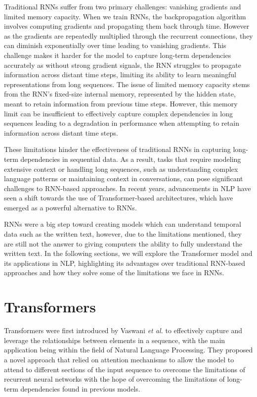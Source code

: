 Traditional RNNs suffer from two primary challenges: vanishing gradients and limited memory capacity. When we train RNNs, the backpropagation algorithm involves computing gradients and propagating them back through time. However as the gradients are repeatedly multiplied through the recurrent connections, they can diminish exponentially over time leading to vanishing gradients. This challenge makes it harder for the model to capture long-term dependencies accurately as without strong gradient signals, the RNN struggles to propagate information across distant time steps, limiting its ability to learn meaningful representations from long sequences. The issue of limited memory capacity stems from the RNN's fixed-size internal memory, represented by the hidden state, meant to retain information from previous time steps. However, this memory limit can be insufficient to effectively capture complex dependencies in long sequences leading to a degradation in performance when attempting to retain information across distant time steps.

These limitations hinder the effectiveness of traditional RNNs in capturing long-term dependencies in sequential data. As a result, tasks that require modeling extensive context or handling long sequences, such as understanding complex language patterns or maintaining context in conversations, can pose significant challenges to RNN-based approaches. In recent years, advancements in NLP have seen a shift towards the use of Transformer-based architectures, which have emerged as a powerful alternative to RNNs. 

RNNs were a big step toward creating models which can understand temporal data such as the written text, however, due to the limitations mentioned, they are still not the answer to giving computers the ability to fully understand the written text. In the following sections, we will explore the Transformer model and its applications in NLP, highlighting its advantages over traditional RNN-based approaches and how they solve some of the limitations we face in RNNs.

\section{Transformers}

Transformers were first introduced by Vaswani \textit{et al.} \cite{transformer_paper} to effectively capture and leverage the relationships between elements in a sequence, with the main application being within the field of Natural Language Processing. They proposed a novel approach that relied on attention mechanisms to allow the model to attend to different sections of the input sequence to overcome the limitations of recurrent neural networks with the hope of overcoming the limitations of long-term dependencies found in previous models.

